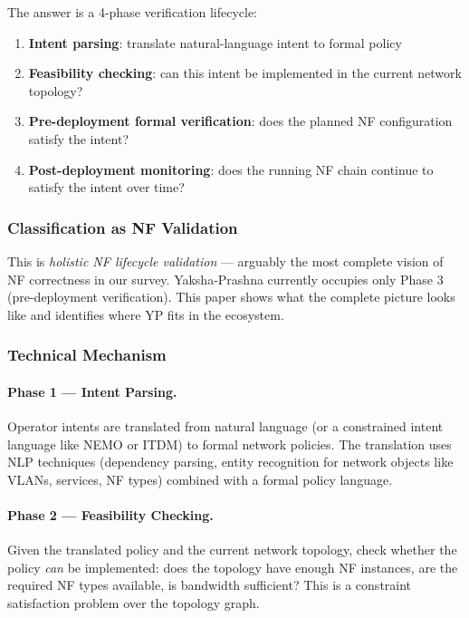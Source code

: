 The answer is a 4-phase verification lifecycle:
\begin{enumerate}
  \item \textbf{Intent parsing}: translate natural-language intent to formal policy
  \item \textbf{Feasibility checking}: can this intent be implemented in the current network topology?
  \item \textbf{Pre-deployment formal verification}: does the planned NF configuration satisfy the intent?
  \item \textbf{Post-deployment monitoring}: does the running NF chain continue to satisfy the intent over time?
\end{enumerate}

\subsubsection{Classification as NF Validation}

This is \emph{holistic NF lifecycle validation} --- arguably the most complete vision of NF correctness in our survey. Yaksha-Prashna currently occupies only Phase 3 (pre-deployment verification). This paper shows what the complete picture looks like and identifies where YP fits in the ecosystem.

\subsubsection{Technical Mechanism}

\paragraph{Phase 1 --- Intent Parsing.}
Operator intents are translated from natural language (or a constrained intent language like NEMO or ITDM) to formal network policies. The translation uses NLP techniques (dependency parsing, entity recognition for network objects like VLANs, services, NF types) combined with a formal policy language.

\paragraph{Phase 2 --- Feasibility Checking.}
Given the translated policy and the current network topology, check whether the policy \emph{can} be implemented: does the topology have enough NF instances, are the required NF types available, is bandwidth sufficient? This is a constraint satisfaction problem over the topology graph.


